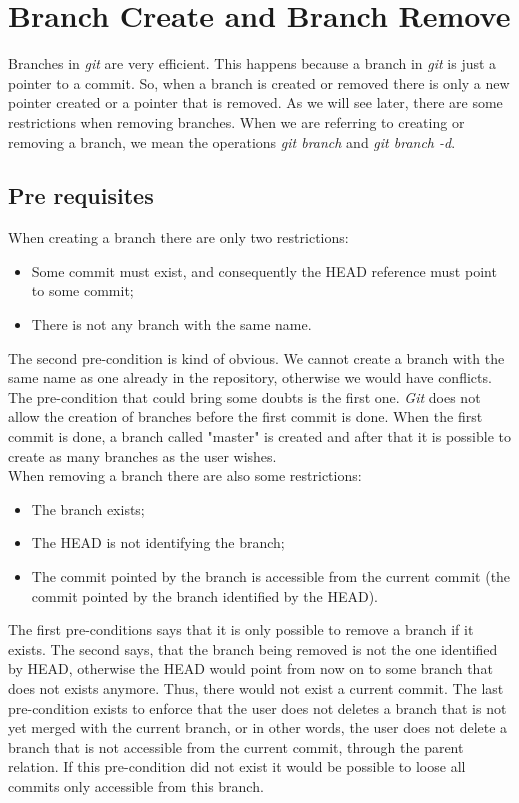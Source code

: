 \section{Branch Create and Branch Remove}
Branches in \emph{git} are very efficient. This happens because a
branch in \emph{git} is just a pointer to a commit. So, when a branch
is created or removed there is only a new pointer created or a
pointer that is removed. As we will see later, there are some
restrictions when removing branches. When we are referring to
creating or removing a branch, we mean the operations
\emph{git branch} and \emph{git branch -d}.

\subsection{Pre requisites}
When creating a branch there are only two restrictions:
\begin{itemize}
   \item Some commit must exist, and consequently the HEAD reference must point
   to some commit;
   \item There is not any branch with the same name.
\end{itemize}
The second pre-condition is kind of obvious. We cannot create a branch
with the same name as one already in the repository, otherwise we
would have conflicts. The pre-condition that could bring some doubts
is the first one. \emph{Git} does not allow the creation of branches
before the first commit is done. When the first commit is done, a
branch called "master" is created and after that it is possible to
create as many branches as the user wishes.\\

When removing a branch there are also some restrictions:
\begin{itemize}
   \item The branch exists;
   \item The HEAD is not identifying the branch;
   \item The commit pointed by the branch is accessible from the
   current commit (the commit pointed by the branch identified by the
   HEAD).
\end{itemize}

The first pre-conditions says that it is only possible to remove a
branch if it exists. The second says, that the branch being removed is
not the one identified by HEAD, otherwise the HEAD would point from
now on to some branch that does not exists anymore. Thus, there would
not exist a current commit. The last pre-condition exists to enforce that
the user does not deletes a branch that is not yet merged with the
current branch, or in other words, the user does not delete a branch
that is not accessible from the current commit, through the parent relation. 
If this pre-condition did not exist it would be possible to loose all 
commits only accessible from this branch.


